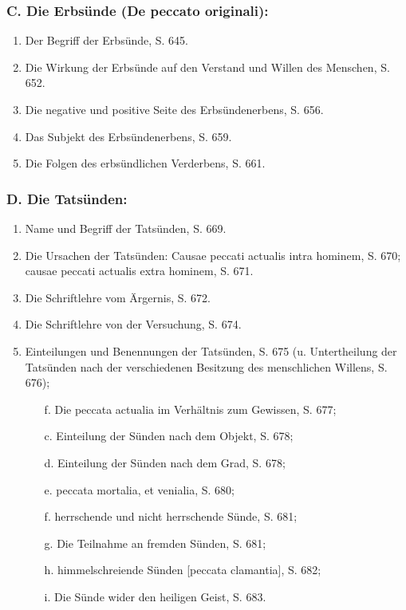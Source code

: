 \subsubsection*{\textbf{C. Die Erbsünde (De peccato originali):}}
\begin{enumerate}
    \item Der Begriff der Erbsünde, S. 645.
    \item Die Wirkung der Erbsünde auf den Verstand und Willen des Menschen, S. 652.
    \item Die negative und positive Seite des Erbsündenerbens, S. 656.
    \item Das Subjekt des Erbsündenerbens, S. 659.
    \item Die Folgen des erbsündlichen Verderbens, S. 661.
\end{enumerate}

\subsubsection*{\textbf{D. Die Tatsünden:}}
\begin{enumerate}
    \item Name und Begriff der Tatsünden, S. 669.
    \item Die Ursachen der Tatsünden: Causae peccati actualis intra hominem, S. 670; causae peccati actualis extra hominem, S. 671.
    \item Die Schriftlehre vom Ärgernis, S. 672.
    \item Die Schriftlehre von der Versuchung, S. 674.
    \item Einteilungen und Benennungen der Tatsünden, S. 675 (u. Untertheilung der Tatsünden nach der verschiedenen Besitzung des menschlichen Willens, S. 676);
    \begin{itemize}
        \item[f.] Die peccata actualia im Verhältnis zum Gewissen, S. 677;
        \item[c.] Einteilung der Sünden nach dem Objekt, S. 678;
        \item[d.] Einteilung der Sünden nach dem Grad, S. 678;
        \item[e.] peccata mortalia, et venialia, S. 680;
        \item[f.] herrschende und nicht herrschende Sünde, S. 681;
        \item[g.] Die Teilnahme an fremden Sünden, S. 681;
        \item[h.] himmelschreiende Sünden [peccata clamantia], S. 682;
        \item[i.] Die Sünde wider den heiligen Geist, S. 683.
    \end{itemize}
\end{enumerate}